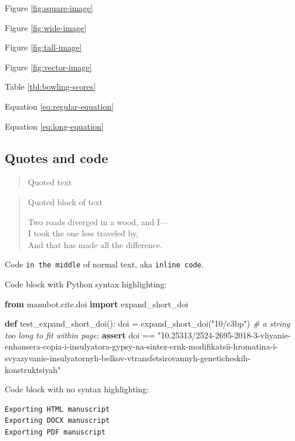 \documentclass[
]{article}
\newenvironment{Shaded}{}{}
\newcommand{\CommentTok}[1]{\textcolor[rgb]{0.38,0.63,0.69}{\textit{#1}}}
\newcommand{\ControlFlowTok}[1]{\textcolor[rgb]{0.00,0.44,0.13}{\textbf{#1}}}
\newcommand{\ImportTok}[1]{\textcolor[rgb]{0.00,0.50,0.00}{\textbf{#1}}}
\newcommand{\KeywordTok}[1]{\textcolor[rgb]{0.00,0.44,0.13}{\textbf{#1}}}
\newcommand{\NormalTok}[1]{#1}
\newcommand{\OperatorTok}[1]{\textcolor[rgb]{0.40,0.40,0.40}{#1}}
\newcommand{\StringTok}[1]{\textcolor[rgb]{0.25,0.44,0.63}{#1}}
\begin{document}
Figure \ref{fig:square-image}

Figure \ref{fig:wide-image}

Figure \ref{fig:tall-image}

Figure \ref{fig:vector-image}

Table \ref{tbl:bowling-scores}

Equation \ref{eq:regular-equation}

Equation \ref{eq:long-equation}

\hypertarget{quotes-and-code}{%
\subsection{Quotes and code}\label{quotes-and-code}}

\begin{quote}
Quoted text
\end{quote}

\begin{quote}
Quoted block of text

Two roads diverged in a wood, and I---\\
I took the one less traveled by,\\
And that has made all the difference.
\end{quote}

Code \texttt{in\ the\ middle} of normal text, aka \texttt{inline\ code}.

Code block with Python syntax highlighting:

\begin{Shaded}
\begin{Highlighting}[]
\ImportTok{from}\NormalTok{ manubot.cite.doi }\ImportTok{import}\NormalTok{ expand\_short\_doi}

\KeywordTok{def}\NormalTok{ test\_expand\_short\_doi():}
\NormalTok{    doi }\OperatorTok{=}\NormalTok{ expand\_short\_doi(}\StringTok{"10/c3bp"}\NormalTok{)}
    \CommentTok{\# a string too long to fit within page:}
    \ControlFlowTok{assert}\NormalTok{ doi }\OperatorTok{==} \StringTok{"10.25313/2524{-}2695{-}2018{-}3{-}vliyanie{-}enhansera{-}copia{-}i{-}insulyatora{-}gypsy{-}na{-}sintez{-}ernk{-}modifikatsii{-}hromatina{-}i{-}svyazyvanie{-}insulyatornyh{-}belkov{-}vtransfetsirovannyh{-}geneticheskih{-}konstruktsiyah"}
\end{Highlighting}
\end{Shaded}

Code block with no syntax highlighting:

\begin{verbatim}
Exporting HTML manuscript
Exporting DOCX manuscript
Exporting PDF manuscript
\end{verbatim}
\end{document}
